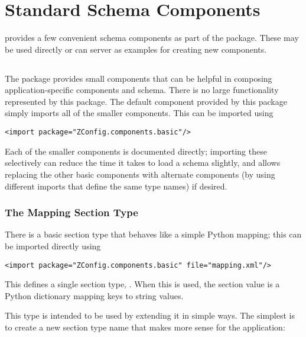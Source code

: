 \documentclass{howto}
\newcommand{\datatype}[1]{\strong{#1}}
\begin{document}
\section{Standard  Schema Components
         \label{standard-components}}

 provides a few convenient schema components as part
of the package.  These may be used directly or can server as examples
for creating new components.


\subsection{}

The  package provides small
components that can be helpful in composing application-specific
components and schema.  There is no large functionality represented by
this package.  The default component provided by this package simply
imports all of the smaller components.  This can be imported using

\begin{verbatim}
<import package="ZConfig.components.basic"/>
\end{verbatim}

Each of the smaller components is documented directly; importing these
selectively can reduce the time it takes to load a schema slightly,
and allows replacing the other basic components with alternate
components (by using different imports that define the same type
names) if desired.


\subsubsection{The Mapping Section Type \label{basic-mapping}}

There is a basic section type that behaves like a simple Python
mapping; this can be imported directly using

\begin{verbatim}
<import package="ZConfig.components.basic" file="mapping.xml"/>
\end{verbatim}

This defines a single section type, \datatype{ZConfig.basic.mapping}.
When this is used, the section value is a Python dictionary mapping
keys to string values.

This type is intended to be used by extending it in simple ways.  The
simplest is to create a new section type name that makes more sense
for the application:
\end{document}

